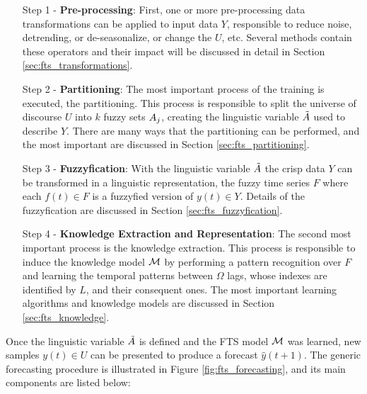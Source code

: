 \begin{enumerate}
    \item[Step 1] - \textbf{Pre-processing}: First, one or more pre-processing data transformations can be applied to input data $Y$, responsible to reduce noise, detrending, or de-seasonalize, or change the $U$, etc. Several methods contain these operators and their impact will be discussed in detail in Section \ref{sec:fts_transformations}.
    
    \item[Step 2] - \textbf{Partitioning}: The most important process of the training is executed, the partitioning. This process is responsible to split the universe of discourse $U$ into $k$ fuzzy sets $A_j$, creating the linguistic variable $\tilde{A}$ used to describe $Y$. There are many ways that the partitioning can be performed, and the most important are discussed in Section \ref{sec:fts_partitioning}.
    
    \item[Step 3] - \textbf{Fuzzyfication}: With the linguistic variable $\tilde{A}$ the crisp data $Y$ can be transformed in a linguistic representation, the fuzzy time series $F$ where each $f(t) \in F$ is a fuzzyfied version of $y(t) \in Y$. Details of the fuzzyfication are discussed in Section \ref{sec:fts_fuzzyfication}.
    
    \item[Step 4] - \textbf{Knowledge Extraction and Representation}: The second most important process is the knowledge extraction. This process is responsible to induce the knowledge model $\mathcal{M}$ by performing a pattern recognition over $F$ and learning the temporal patterns between  $\Omega$ lags, whose indexes are identified by $L$, and their consequent ones. The most important learning algorithms and knowledge models are discussed in Section \ref{sec:fts_knowledge}.
\end{enumerate}

Once the linguistic variable $\tilde{A}$ is defined and the FTS model $\mathcal{M}$ was learned, new samples $y(t) \in U$ can be presented to produce a forecast $\hat{y}(t+1)$. The generic forecasting procedure is illustrated in Figure \ref{fig:fts_forecasting}, and its main components are listed below:

